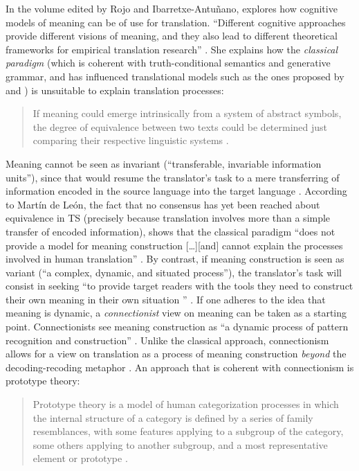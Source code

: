 In the volume edited by Rojo and Ibarretxe-Antuñano, \citet{rojo_who_2013} explores how cognitive models of meaning can be of use for translation. “Different cognitive approaches provide different visions of meaning, and they also lead to different theoretical frameworks for empirical translation research” \citep[99]{rojo_who_2013}. She explains how the \textit{classical} \textit{paradigm} (which is coherent with truth-conditional semantics and generative grammar, and has influenced translational models such as the ones proposed by \citealt{nida_toward_1964} and \citealt{kade_zufall_1968}) is unsuitable to explain translation processes:

\begin{quote}
If meaning could emerge intrinsically from a system of abstract symbols, the degree of equivalence between two texts could be determined just comparing their respective linguistic systems \citep[103]{rojo_who_2013}.
\end{quote}

Meaning cannot be seen as invariant (“transferable, invariable information units”), since that would resume the translator’s task to a mere transferring of information encoded in the source language into the target language \citep[99]{rojo_who_2013}. According to Martín de León, the fact that no consensus has yet been reached about equivalence in TS (precisely because translation involves more than a simple transfer of encoded information), shows that the classical paradigm “does not provide a model for meaning construction […][and] cannot explain the processes involved in human translation” \citep[103]{rojo_who_2013}. By contrast, if meaning construction is seen as variant (“a complex, dynamic, and situated process”), the translator’s task will consist in seeking “to provide target readers with the tools they need to construct their own meaning in their own situation \citep{risku_translationsmanagement._2004}” \citep[99]{rojo_who_2013}. If one adheres to the idea that meaning is dynamic, a \textit{connectionist} view on meaning can be taken as a starting point. Connectionists see meaning construction as “a dynamic process of pattern recognition and construction” \citep[100]{rojo_who_2013}. Unlike the classical approach, connectionism allows for a view on translation as a process of meaning construction \textit{beyond} the decoding-recoding metaphor \citep[105]{rojo_who_2013}. An approach that is coherent with connectionism is prototype theory:

\begin{quote}
Prototype theory is a model of human categorization processes in which the internal structure of a category is defined by a series of family resemblances, with some features applying to a subgroup of the category, some others applying to another subgroup, and a most representative element or prototype \citep[106]{rojo_who_2013}.
\end{quote}

